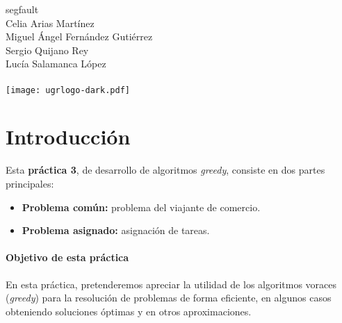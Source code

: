 \documentclass[10pt, a4paper]{article}
\theoremstyle{theorem-style}
\theoremstyle{theorem-style}
\theoremstyle{definition-style}
\theoremstyle{remark-style}
\theoremstyle{example-style}
\theoremstyle{definition-style}
\theoremstyle{remark-style}
\newcommand{\autor}{Celia Arias Martínez\\Miguel Ángel Fernández Gutiérrez\\Sergio Quijano Rey\\Lucía Salamanca López\\\hspace{1cm}}
\newcommand{\grado}{segfault}
\begin{document}
\begin{titlepage}

  \parbox[t]{\textwidth}{
  	\raggedright %
  	\fontsize{40pt}{40pt}\selectfont\sffamily{}
  }

	\vfill
	
	\parbox[t]{\textwidth}{
		\raggedright %
		\sffamily\large
		\grado\\
		{\Large \autor }\\[15pt]
		\texttt{[image: ugrlogo-dark.pdf]}
	}

\end{titlepage}


\thispagestyle{empty}
\tableofcontents
\newpage


\part{Introducción}

Esta \textbf{práctica 3}, de desarrollo de algoritmos \emph{greedy}, consiste en dos partes principales:

\begin{itemize}
	\item \textbf{Problema común:} problema del viajante de comercio.
	\item \textbf{Problema asignado:} asignación de tareas.
\end{itemize}

\subsection*{Objetivo de esta práctica}

En esta práctica, pretenderemos apreciar la utilidad de los algoritmos voraces (\emph{greedy}) para la resolución de problemas de forma eficiente, en algunos casos obteniendo soluciones óptimas y en otros aproximaciones.
\end{document}
